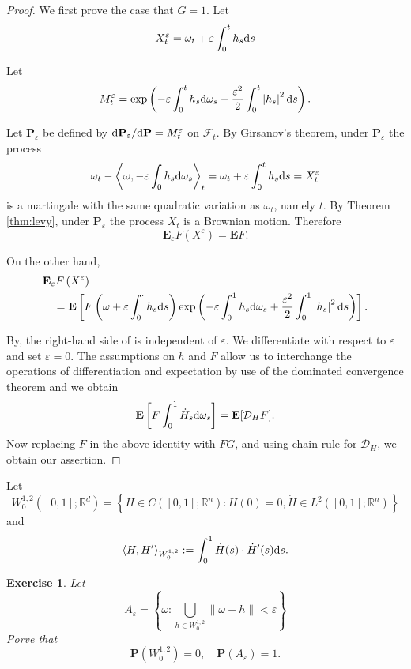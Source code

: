 \documentclass[twoside, 12pt]{book}
\numberwithin{equation}{chapter}
\newtheorem{exercise}{Exercise}[section]
\def\cD{{\mathcal D}}
\def\mR{{\mathbb R}}
\def\bP{{\mathbf P}}
\def\l{\left}
\def\r{\right}
\def\<{\langle}
\def\>{\rangle}
\def\d{\text{\rm{d}}}
\def\eps{\varepsilon}
\begin{document}
    \begin{proof}
    We first prove the case that $G=1$. Let
    $$
      X_t^{\varepsilon}=\omega_t+\varepsilon \int_0^t h_s \d s
    $$

     Let
    $$
         M_t^{\varepsilon}=\exp \left(-\varepsilon \int_0^t h_s \d \omega_s-\frac{\varepsilon^2}{2} \int_0^t\left|h_s\right|^2 \d s\right) .
    $$

     Let $\mathbf{P}_{\varepsilon}$ be defined by $\d \mathbf{P}_{\varepsilon} / \d \mathbf{P}=M_t^{\varepsilon}$ on $\mathcal{F}_t$. By Girsanov's theorem, under $\mathbf{P}_{\varepsilon}$ the process
    $$
        \omega_t-\left\langle \omega,-\varepsilon \int_0 h_s \d \omega_s\right\rangle_t=\omega_t+\varepsilon \int_0^t h_s \d s=X_t^{\varepsilon}
    $$
    is a martingale with the same quadratic variation as $\omega_t$, namely $t$. By Theorem \ref{thm:levy}, under $\mathbf{P}_{\varepsilon}$ the process $X_t$ is a Brownian motion. Therefore
    $$
        \mathbf{E}_{\varepsilon} F\left(X^{\varepsilon}\right)=\mathbf{E} F.
    $$

    On the other hand,
    $$
    \begin{aligned}
    & \mathbf{E}_{\varepsilon} F\left(X^{\varepsilon}\right) \\
    & \quad=\mathbf{E}\left[F\left(\omega+\varepsilon \int_0^\cdot h_s \d s\right) \exp \left(-\varepsilon \int_0^1 h_s \d \omega_s+\frac{\varepsilon^2}{2} \int_0^1\left|h_s\right|^2 \d s\right)\right] .
    \end{aligned}
    $$

    By, the right-hand side of  is independent of $\varepsilon$. We differentiate with respect to $\varepsilon$ and set $\varepsilon=0$. The assumptions on $h$ and $F$ allow us to interchange the operations of differentiation and expectation by use of the dominated convergence theorem and we obtain
    \[
        \mathbf{E}\left[F \int_0^1 \dot H_s \d \omega_s\right]=\mathbf{E} [ \cD_H F].
    \]
    Now replacing $F$ in the above identity with $FG$, and using chain rule for $\cD_H$, we obtain our assertion. 
    \end{proof}
   
    Let 
    \[
        W^{1,2}_0([0,1];\mR^d)=\l\{H\in C([0,1];\mR^n): H(0)=0, \dot H\in L^2([0,1];\mR^n)\r\}
    \]
    and 
    \[
    \<H, H'\>_{W^{1,2}_0}:= \int_0^1 \dot H(s)\cdot \dot H'(s) \d s. 
    \]
    
    
    \begin{exercise}
    	Let 
    	\[
    	    A_\eps= \l\{\omega: \bigcup_{h\in W^{1,2}_0} \|\omega-h\|<\eps\r\}
    	\]
    	Porve that 
    	\[
    	    \bP \l(W^{1,2}_0\r)=0, \quad \bP (A_\eps)=1. 
    	\]
    \end{exercise}
    
\end{document}
